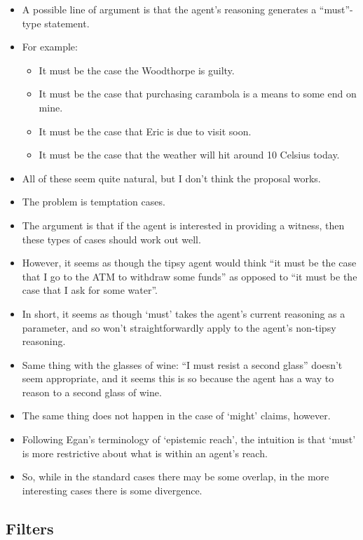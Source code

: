 \documentclass[10pt]{article}
\begin{document}
\begin{itemize}
\item A possible line of argument is that the agent's reasoning generates a ``must''-type statement.
\item For example:
  \begin{itemize}
  \item It must be the case the Woodthorpe is guilty.
  \item It must be the case that purchasing carambola is a means to some end on mine.
  \item It must be the case that Eric is due to visit soon.
  \item It must be the case that the weather will hit around 10 Celsius today.
  \end{itemize}
\item All of these seem quite natural, but I don't think the proposal works.
\item The problem is temptation cases.
\item The argument is that if the agent is interested in providing a witness, then these types of cases should work out well.
\item However, it seems as though the tipsy agent would think ``it must be the case that I go to the ATM to withdraw some funds'' as opposed to ``it must be the case that I ask for some water''.
\item In short, it seems as though `must' takes the agent's current reasoning as a parameter, and so won't straightforwardly apply to the agent's non-tipsy reasoning.
\item Same thing with the glasses of wine: ``I must resist a second glass'' doesn't seem appropriate, and it seems this is so because the agent has a way to reason to a second glass of wine.
\item The same thing does not happen in the case of `might' claims, however.
\item Following Egan's terminology of `epistemic reach', the intuition is that `must' is more restrictive about what is within an agent's reach.
\item So, while in the standard cases there may be some overlap, in the more interesting cases there is some divergence.
\end{itemize}

\subsection{Filters}
\label{sec:filters}
\end{document}
